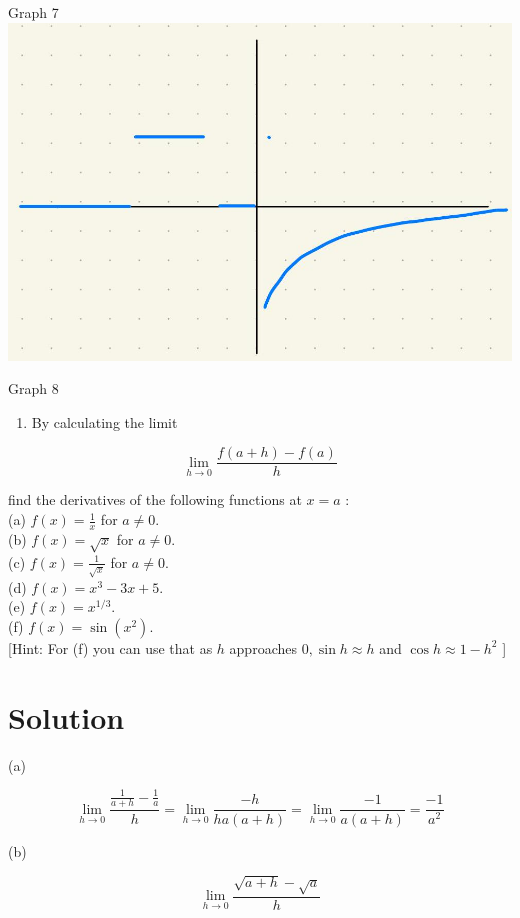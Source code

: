 \documentclass[10pt]{article}
\begin{document}
Graph 7\\
\includegraphics[max width=\textwidth, center]{2024_12_26_646789e1ccd1e87aeca8g-09}

Graph 8

\begin{enumerate}
  \item By calculating the limit
\end{enumerate}

$$
\lim _{h \rightarrow 0} \frac{f(a+h)-f(a)}{h}
$$

find the derivatives of the following functions at $x=a$ :\\
(a) $f(x)=\frac{1}{x}$ for $a \neq 0$.\\
(b) $f(x)=\sqrt{x}$ for $a \neq 0$.\\
(c) $f(x)=\frac{1}{\sqrt{x}}$ for $a \neq 0$.\\
(d) $f(x)=x^{3}-3 x+5$.\\
(e) $f(x)=x^{1 / 3}$.\\
(f) $f(x)=\sin \left(x^{2}\right)$.\\[0pt]
[Hint: For (f) you can use that as $h$ approaches $0, \sin h \approx h$ and $\cos h \approx 1-h^{2}$ ]

\section*{Solution}
(a)

$$
\lim _{h \rightarrow 0} \frac{\frac{1}{a+h}-\frac{1}{a}}{h}=\lim _{h \rightarrow 0} \frac{-h}{h a(a+h)}=\lim _{h \rightarrow 0} \frac{-1}{a(a+h)}=\frac{-1}{a^{2}}
$$

(b)

$$
\lim _{h \rightarrow 0} \frac{\sqrt{a+h}-\sqrt{a}}{h}
$$
\end{document}
